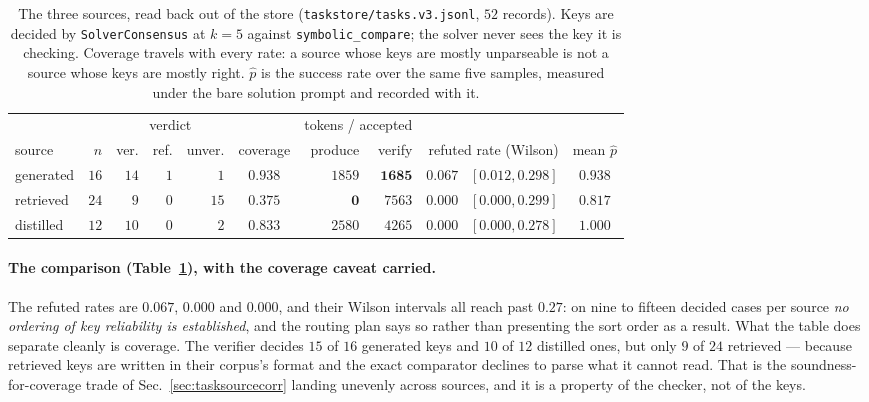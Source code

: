 \begin{table}[t]
\centering\small
\caption{The three sources, read back out of the store
(\texttt{taskstore/tasks.v3.jsonl}, $52$ records). Keys are decided by \texttt{SolverConsensus}
at $k{=}5$ against \texttt{symbolic\_compare}; the solver never sees the key it is checking.
Coverage travels with every rate: a source whose keys are mostly unparseable is not a source
whose keys are mostly right. $\hat{p}$ is the success rate over the same five samples, measured
under the bare solution prompt and recorded with it.}
\label{tab:storesources}
\begin{tabular}{lrrrrcrrrc}
\toprule
& & \multicolumn{3}{c}{verdict} & & \multicolumn{2}{c}{tokens / accepted} & & \\
\cmidrule(lr){3-5}\cmidrule(lr){7-8}
source & $n$ & ver. & ref. & unver. & coverage & produce & verify & refuted rate (Wilson) & mean $\hat{p}$ \\
\midrule
generated & $16$ & $14$ & $1$ & $1$  & $0.938$ & $1859$ & $\mathbf{1685}$ & $0.067$ \ $[0.012, 0.298]$ & $0.938$ \\
retrieved & $24$ & $9$  & $0$ & $15$ & $\mathbf{0.375}$ & $\mathbf{0}$ & $7563$ & $0.000$ \ $[0.000, 0.299]$ & $0.817$ \\
distilled & $12$ & $10$ & $0$ & $2$  & $0.833$ & $2580$ & $4265$ & $0.000$ \ $[0.000, 0.278]$ & $1.000$ \\
\bottomrule
\end{tabular}
\end{table}

\paragraph{The comparison (Table~\ref{tab:storesources}), with the coverage caveat carried.}
The refuted rates are $0.067$, $0.000$ and $0.000$, and their Wilson intervals all reach past
$0.27$: on nine to fifteen decided cases per source \emph{no ordering of key reliability is
established}, and the routing plan says so rather than presenting the sort order as a result.
What the table does separate cleanly is coverage. The verifier decides $15$ of $16$ generated
keys and $10$ of $12$ distilled ones, but only $9$ of $24$ retrieved --- because retrieved keys
are written in their corpus's format and the exact comparator declines to parse what it cannot
read. That is the soundness-for-coverage trade of Sec.~\ref{sec:tasksourcecorr} landing
unevenly across sources, and it is a property of the checker, not of the keys.


